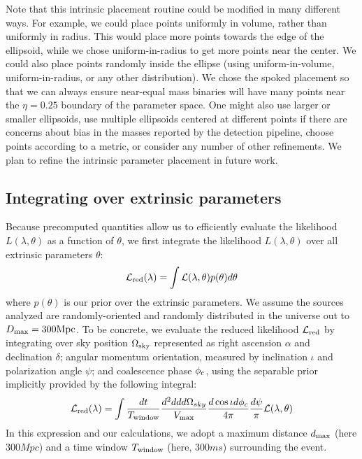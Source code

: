 Note that this intrinsic placement routine could be modified in many different ways. For example, 
we could place points uniformly in volume, rather than uniformly in radius. This would place more points
towards the edge of the ellipsoid, while we chose uniform-in-radius to get more points near the center.
We could also place points randomly inside the ellipse (using uniform-in-volume, uniform-in-radius, 
or any other distribution). We chose the spoked placement so that we can always ensure near-equal mass binaries
will have many points near the $\eta = 0.25$ boundary of the parameter space.
One might also use larger or smaller ellipsoids, use multiple ellipsoids centered at different points if there are concerns
about bias in the masses reported by the detection pipeline, choose points according to a metric, 
or consider any number of other refinements. We plan to refine the intrinsic parameter placement in future work.





\subsection{Integrating over extrinsic parameters}
\label{subsec:extrinsic}

Because precomputed quantities allow us to efficiently evaluate the likelihood $L(\lambda,\theta)$ as a function of
$\theta$, we first integrate the likelihood $L(\lambda,\theta)$ over all extrinsic parameters $\theta$:
\begin{eqnarray}
{\cal L}_{\rm red}(\lambda) = \int {\cal L}(\lambda,\theta) p(\theta) d\theta
\end{eqnarray}
where $p(\theta)$ is our prior over the extrinsic  parameters.  We assume the sources analyzed are randomly-oriented and
randomly distributed in the universe out to $D_{\rm max}=300 {\rm Mpc}$.  
To be concrete, we evaluate the reduced likelihood ${\cal L}_{\rm red}$ by integrating over sky position $\Omega_{\rm sky}$ represented
as right ascension $\alpha$ and declination $\delta$; angular momentum orientation, measured by inclination $\iota$ and
polarization angle $\psi$;  and coalescence phase $\phi_{\rm c}$, using the separable prior implicitly provided by the
following integral:
\begin{eqnarray}
{\cal L}_{\rm red}(\lambda) = \int \frac{dt}{T_{\rm window}} \frac{d^2 dd d\Omega_{sky} }{V_{\rm max}} \frac{d \cos \iota d\phi_c}{4\pi} \frac{d\psi}{\pi} {\cal L}(\lambda,\theta)
\end{eqnarray}
%
In this expression and our calculations, we adopt a maximum distance $d_{\rm max}$ (here $300 \unit{Mpc}$) and a time window
$ T_{\rm window}$  (here, $300\unit{ms}$)  surrounding the event.  

